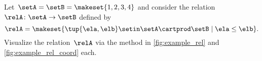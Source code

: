 \vfill
\begin{gradedexercise}
    \label{ex:visualize-leq-relation}
    Let~$\setA = \setB = \makeset{1, 2, 3, 4 }$ and consider the relation~$\relA \colon \setA \to  \setB$ defined by
    \begin{equation}
        \relA = \makeset{ \tup{\ela,\elb} \setin \setA \cartprod \setB \mid \ela \leq \elb }.
    \end{equation}
    Visualize the relation~$\relA$ via the method in \cref{fig:example_rel} and \cref{fig:example_rel_coord} each.
\end{gradedexercise}

